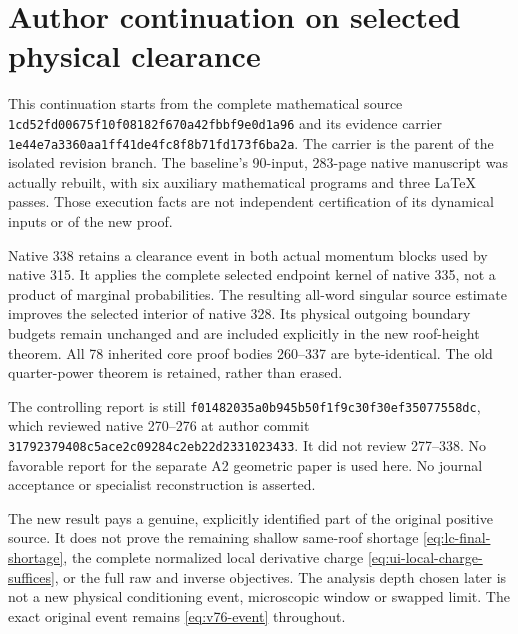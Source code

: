 \section*{Author continuation on selected physical clearance}
This continuation starts from the complete mathematical source
\texttt{1cd52fd0\allowbreak{}0675f10f\allowbreak{}08182f67\allowbreak{}0a42fbbf\allowbreak{}9e0d1a96}
and its evidence carrier
\texttt{1e44e7a3\allowbreak{}360aa1ff\allowbreak{}41de4fc8\allowbreak{}f8b71fd1\allowbreak{}73f6ba2a}.
The carrier is the parent of the isolated revision branch. The baseline's
90-input, 283-page native manuscript was actually rebuilt, with six auxiliary
mathematical programs and three LaTeX passes. Those execution facts are not
independent certification of its dynamical inputs or of the new proof.

Native 338 retains a clearance event in both actual momentum blocks used by
native 315. It applies the complete selected endpoint kernel of native 335,
not a product of marginal probabilities. The resulting all-word singular
source estimate improves the selected interior of native 328. Its physical
outgoing boundary budgets remain unchanged and are included explicitly in
the new roof-height theorem. All 78 inherited core proof bodies 260--337 are
byte-identical. The old quarter-power theorem is retained, rather than erased.

The controlling report is still
\texttt{f0148203\allowbreak{}5a0b945b\allowbreak{}50f1f9c3\allowbreak{}0f30ef35\allowbreak{}077558dc},
which reviewed native 270--276 at author commit
\texttt{31792379\allowbreak{}408c5ace\allowbreak{}2c09284c\allowbreak{}2eb22d23\allowbreak{}31023433}.
It did not review 277--338. No favorable report for the separate A2 geometric
paper is used here. No journal acceptance or specialist reconstruction is
asserted.

The new result pays a genuine, explicitly identified part of the original
positive source. It does not prove the remaining shallow same-roof shortage
\eqref{eq:lc-final-shortage}, the complete normalized local derivative charge
\eqref{eq:ui-local-charge-suffices}, or the full raw and inverse objectives.
The analysis depth chosen later is not a new physical conditioning event,
microscopic window or swapped limit. The exact original event remains
\eqref{eq:v76-event} throughout.
